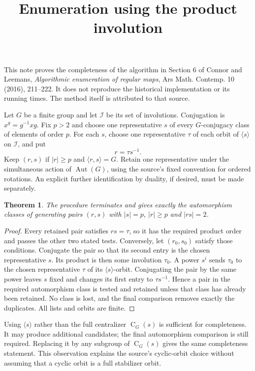 \documentclass[11pt]{article}
\title{Enumeration using the product involution}
\author{}\date{}
\newtheorem{theorem}{Theorem}
\newcommand{\Aut}{\operatorname{Aut}}
\newcommand{\C}{\operatorname{C}}
\begin{document}
\maketitle
This note proves the completeness of the algorithm in Section 6 of
Connor and Leemans, \emph{Algorithmic enumeration of regular maps},
Ars Math. Contemp. 10 (2016), 211--222. It does not reproduce the
historical implementation or its running times. The method itself is
attributed to that source.

Let $G$ be a finite group and let $\mathcal I$ be its set of involutions.
Conjugation is $x^g=g^{-1}xg$. Fix $p>2$ and choose one representative
$s$ of every $G$-conjugacy class of elements of order $p$. For each $s$,
choose one representative $\tau$ of each orbit of $\langle s\rangle$
on $\mathcal I$, and put
\[
 r=\tau s^{-1}.
\]
Keep $(r,s)$ if $|r|\ge p$ and $\langle r,s\rangle=G$. Retain one
representative under the simultaneous action of $\Aut(G)$, using the
source's fixed convention for ordered rotations. An explicit further
identification by duality, if desired, must be made separately.

\begin{theorem}
The procedure terminates and gives exactly the automorphism classes
of generating pairs $(r,s)$ with $|s|=p$, $|r|\ge p$ and $|rs|=2$.
\end{theorem}
\begin{proof}
Every retained pair satisfies $rs=\tau$, so it has the required product
order and passes the other two stated tests. Conversely, let $(r_0,s_0)$
satisfy those conditions. Conjugate the pair so that its second entry is
the chosen representative $s$. Its product is then some involution $\tau_0$.
A power $s^i$ sends $\tau_0$ to the chosen representative $\tau$ of its
$\langle s\rangle$-orbit. Conjugating the pair by the same power leaves
$s$ fixed and changes its first entry to $\tau s^{-1}$. Hence a pair in
the required automorphism class is tested and retained unless that class
has already been retained. No class is lost, and the final comparison
removes exactly the duplicates. All lists and orbits are finite.
\end{proof}

Using $\langle s\rangle$ rather than the full centralizer $\C_G(s)$
is sufficient for completeness. It may produce additional candidates;
the final automorphism comparison is still required. Replacing it by
any subgroup of $\C_G(s)$ gives the same completeness statement.
This observation explains the source's cyclic-orbit choice without
assuming that a cyclic orbit is a full stabilizer orbit.
\end{document}

